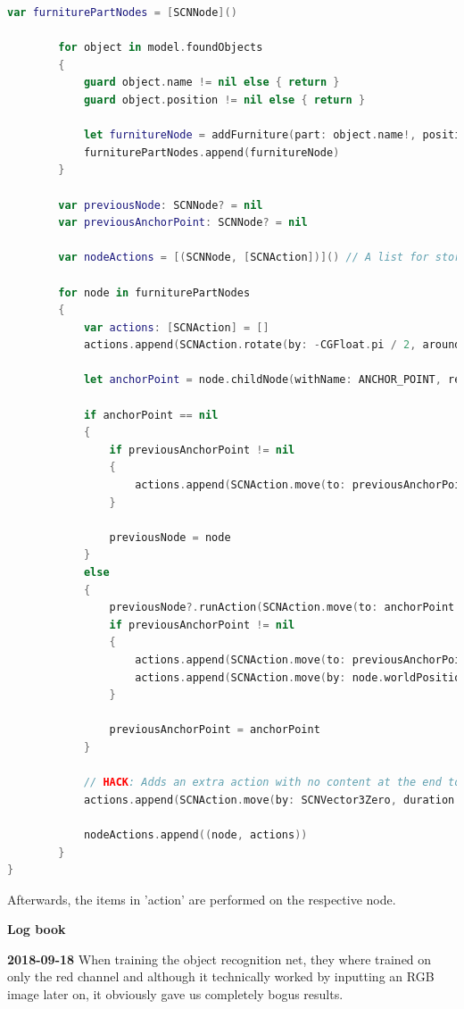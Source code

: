 \begin{lstlisting}[language=swift]
    var furniturePartNodes = [SCNNode]()

        for object in model.foundObjects
        {
            guard object.name != nil else { return }
            guard object.position != nil else { return }
            
            let furnitureNode = addFurniture(part: object.name!, position: object.position!)
            furniturePartNodes.append(furnitureNode)
        }
        
        var previousNode: SCNNode? = nil
        var previousAnchorPoint: SCNNode? = nil
        
        var nodeActions = [(SCNNode, [SCNAction])]() // A list for storing animations to run on a node later
        
        for node in furniturePartNodes
        {
            var actions: [SCNAction] = []
            actions.append(SCNAction.rotate(by: -CGFloat.pi / 2, around: SCNVector3(0, 0, 1), duration: 1))

            let anchorPoint = node.childNode(withName: ANCHOR_POINT, recursively: true)
            
            if anchorPoint == nil
            {
                if previousAnchorPoint != nil
                {
                    actions.append(SCNAction.move(to: previousAnchorPoint!.worldPosition, duration: 2))
                }

                previousNode = node
            }
            else
            {
                previousNode?.runAction(SCNAction.move(to: anchorPoint!.worldPosition, duration: 2))
                if previousAnchorPoint != nil
                {
                    actions.append(SCNAction.move(to: previousAnchorPoint!.worldPosition, duration: 2))
                    actions.append(SCNAction.move(by: node.worldPosition.substract(other: anchorPoint!.worldPosition), duration: 2))
                }

                previousAnchorPoint = anchorPoint
            }
            
            // HACK: Adds an extra action with no content at the end to make completion handler wait until the last action is done
            actions.append(SCNAction.move(by: SCNVector3Zero, duration: 1))
            
            nodeActions.append((node, actions))
        }
}
\end{lstlisting}

Afterwards, the items in 'action' are performed on the respective node.

\begin{center}
\textbf{Log book}
\end{center}

\textbf{2018-09-18}
When training the object recognition net, they where trained on only the red channel and although it technically worked by inputting an RGB image later on, it obviously gave us completely bogus results.

\newpage